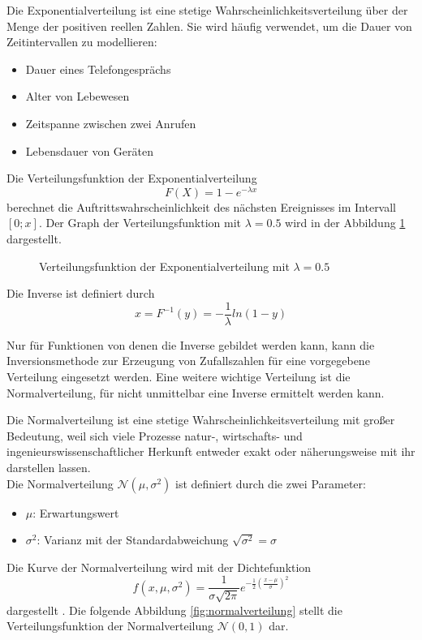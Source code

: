 Die Exponentialverteilung ist eine stetige Wahrscheinlichkeitsverteilung über der Menge der positiven reellen Zahlen. Sie wird häufig verwendet, um die Dauer von Zeitintervallen zu modellieren:
\begin{itemize}
    \item Dauer eines Telefongesprächs
    \item Alter von Lebewesen
    \item Zeitspanne zwischen zwei Anrufen
    \item Lebensdauer von Geräten
\end{itemize}
Die Verteilungsfunktion der Exponentialverteilung 
$$F(X)=1-e^{-\lambda x}$$
berechnet die Auftrittswahrscheinlichkeit des nächsten Ereignisses im Intervall $[0;x]$. Der Graph der Verteilungsfunktion mit $\lambda=0.5$ wird in der Abbildung \ref{fig:exponentialverteilung} dargestellt.

\begin{figure}[H]
    \centering
    \caption{Verteilungsfunktion der Exponentialverteilung mit $\lambda=0.5$}
    \label{fig:exponentialverteilung}
\end{figure}

Die Inverse ist definiert durch
$$x=F^{-1}(y)=-\frac{1}{\lambda}ln(1-y)$$

Nur für Funktionen von denen die Inverse gebildet werden kann, kann die Inversionsmethode zur Erzeugung von Zufallszahlen für eine vorgegebene Verteilung eingesetzt werden. Eine weitere wichtige Verteilung ist die Normalverteilung, für nicht unmittelbar eine Inverse ermittelt werden kann. 

Die Normalverteilung ist eine stetige Wahrscheinlichkeitsverteilung mit großer Bedeutung, weil sich viele Prozesse natur-, wirtschafts- und ingenieurswissenschaftlicher Herkunft entweder exakt oder näherungsweise mit ihr darstellen lassen.\\ 
Die Normalverteilung $\mathcal{N}(\mu,\sigma ^2)$ ist definiert durch die zwei Parameter: 
\begin{itemize}
    \item $\mu$: Erwartungswert
    \item $\sigma^2$: Varianz mit der Standardabweichung $\sqrt{\sigma^2}=\sigma$
\end{itemize}
Die Kurve der Normalverteilung wird mit der Dichtefunktion
\medskip
$$f(x,\mu,\sigma^2)=\frac{1}{\sigma\sqrt{2\pi}}e^{-\frac{1}{2}(\frac{x-\mu}{\sigma})^2}$$
\medskip
dargestellt \cite{Inversionsmethode}. Die folgende Abbildung \ref{fig:normalverteilung} stellt die Verteilungsfunktion der Normalverteilung $\mathcal{N}(0,1)$ dar.

